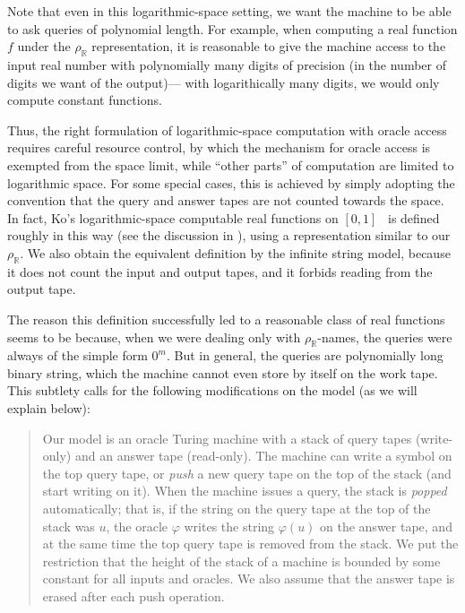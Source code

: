 \documentclass[envcountsect,envcountsame,orivec,oribibl]{llncs}
\newcommand{\R}{\mathbb R}
\newcommand{\rhoR}{\rho _\R}
\begin{document}
Note that even in this logarithmic-space setting, 
we want the machine to be able to ask queries of polynomial length. 
For example, when computing a real function $f$ under the $\rhoR$ representation, 
it is reasonable to give the machine access to 
the input real number with polynomially many digits of precision 
(in the number of digits we want of the output)---%
with logarithically many digits, 
we would only compute constant functions. 

Thus, the right formulation of logarithmic-space computation with oracle access 
requires careful resource control, by which 
the mechanism for oracle access is exempted from the space limit, 
while ``other parts'' of computation are limited to logarithmic space. 
For some special cases, 
this is achieved by simply adopting the convention that 
the query and answer tapes 
are not counted towards the space. 
In fact, Ko's logarithmic-space computable real functions on $[0, 1]$~%
\cite[Chapter~4]{ko1991complexity} is defined roughly in this way
(see the discussion in \cite[pp.~121--122]{ko1991complexity}), 
using a representation similar to our $\rhoR$. 
We also obtain the equivalent definition 
by the infinite string model, 
because it does not count the input and output tapes, 
and it forbids reading from the output tape. 

The reason this definition successfully led to a reasonable class of real functions
seems to be because, 
when we were dealing only with $\rhoR$-names, 
the queries were always of the simple form $0 ^m$. 
But in general, 
the queries are polynomially long binary string, 
which the machine cannot even store by itself on the work tape. 
This subtlety calls for the following modifications on the model
(as we will explain below): 

\begin{quote}
Our model is an oracle Turing machine 
with a stack of query tapes (write-only) and an answer tape (read-only).
The machine can write a symbol on the top query tape, or 
\emph{push} a new query tape on the top of the stack (and start writing on it).
When the machine issues a query, the stack is \emph{popped} automatically; 
that is, 
if the string on the query tape at the top of the stack was $u$, 
the oracle $\varphi$ writes the string $\varphi (u)$ on the answer tape, 
and at the same time the top query tape is removed from the stack. 
We put the restriction that the height of the stack of a machine is 
bounded by some constant for all inputs and oracles.
We also assume that 
the answer tape is erased after each push operation.
\end{quote}
\end{document}
